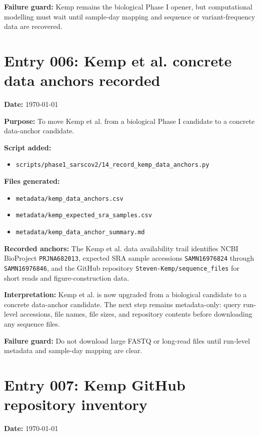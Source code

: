 \textbf{Failure guard:} Kemp remains the biological Phase I opener, but computational modelling must wait until sample-day mapping and sequence or variant-frequency data are recovered.


\section*{Entry 006: Kemp et al. concrete data anchors recorded}

\textbf{Date:} \today

\textbf{Purpose:} To move Kemp et al. from a biological Phase I candidate to a concrete data-anchor candidate.

\textbf{Script added:}
\begin{itemize}
    \item \texttt{scripts/phase1\_sarscov2/14\_record\_kemp\_data\_anchors.py}
\end{itemize}

\textbf{Files generated:}
\begin{itemize}
    \item \texttt{metadata/kemp\_data\_anchors.csv}
    \item \texttt{metadata/kemp\_expected\_sra\_samples.csv}
    \item \texttt{metadata/kemp\_data\_anchor\_summary.md}
\end{itemize}

\textbf{Recorded anchors:} The Kemp et al. data availability trail identifies NCBI BioProject \texttt{PRJNA682013}, expected SRA sample accessions \texttt{SAMN16976824} through \texttt{SAMN16976846}, and the GitHub repository \texttt{Steven-Kemp/sequence\_files} for short reads and figure-construction data.

\textbf{Interpretation:} Kemp et al. is now upgraded from a biological candidate to a concrete data-anchor candidate. The next step remains metadata-only: query run-level accessions, file names, file sizes, and repository contents before downloading any sequence files.

\textbf{Failure guard:} Do not download large FASTQ or long-read files until run-level metadata and sample-day mapping are clear.


\section*{Entry 007: Kemp GitHub repository inventory}

\textbf{Date:} \today

